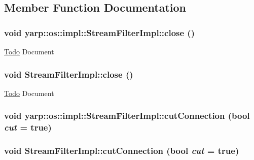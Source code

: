 \subsection{Member Function Documentation}
\hypertarget{classyarp_1_1os_1_1impl_1_1_stream_filter_impl_ad7161adcaae840c0f88c7d24312b774f}{
\subsubsection[{close}]{\setlength{\rightskip}{0pt plus 5cm}void yarp::os::impl::StreamFilterImpl::close ()}}
\label{classyarp_1_1os_1_1impl_1_1_stream_filter_impl_ad7161adcaae840c0f88c7d24312b774f}
\begin{Desc}
\item[\hyperlink{todo__todo000016}{Todo}]Document \end{Desc}
\hypertarget{classyarp_1_1os_1_1impl_1_1_stream_filter_impl_afe2c98307b0051805788c690b160b977}{
\subsubsection[{close}]{\setlength{\rightskip}{0pt plus 5cm}void StreamFilterImpl::close ()}}
\label{classyarp_1_1os_1_1impl_1_1_stream_filter_impl_afe2c98307b0051805788c690b160b977}
\begin{Desc}
\item[\hyperlink{todo__todo000006}{Todo}]Document \end{Desc}
\hypertarget{classyarp_1_1os_1_1impl_1_1_stream_filter_impl_a48096e050f252e896ad831a12da0c6b3}{
\subsubsection[{cutConnection}]{\setlength{\rightskip}{0pt plus 5cm}void yarp::os::impl::StreamFilterImpl::cutConnection (bool {\em cut} = {\ttfamily true})}}
\label{classyarp_1_1os_1_1impl_1_1_stream_filter_impl_a48096e050f252e896ad831a12da0c6b3}
\hypertarget{classyarp_1_1os_1_1impl_1_1_stream_filter_impl_a9a7a37fe9ac8b71cc7a6a54a118617fc}{
\subsubsection[{cutConnection}]{\setlength{\rightskip}{0pt plus 5cm}void StreamFilterImpl::cutConnection (bool {\em cut} = {\ttfamily true})}}
